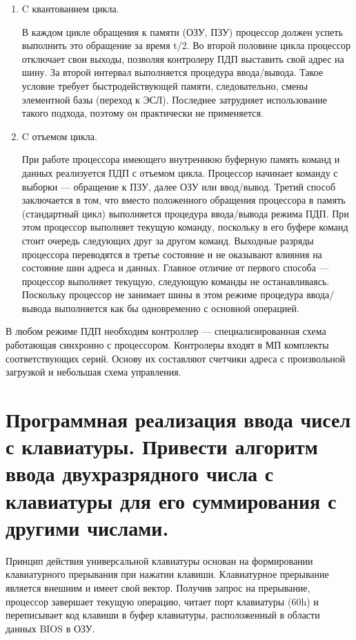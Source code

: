 \documentclass[unicode, 12pt, a4paper, oneside]{article}
\begin{document}
\begin{enumerate}
\begin{enumerate}
	\item C квантованием цикла.
	\par В каждом цикле обращения к памяти (ОЗУ, ПЗУ) процессор должен успеть выполнить это обращение за время t/2. Во второй половине цикла процессор отключает свои выходы, позволяя контролеру ПДП выставить свой адрес на шину. За второй интервал выполняется процедура ввода/вывода. Такое условие требует быстродействующей памяти, следовательно, смены элементной базы (переход к ЭСЛ). Последнее затрудняет использование такого подхода, поэтому он практически не применяется.
	
	\item C отъемом цикла.
	\par При работе процессора имеющего внутреннюю буферную память команд и данных реализуется ПДП с отъемом цикла. Процессор начинает команду с выборки — обращение к ПЗУ, далее ОЗУ или ввод/вывод. Третий способ заключается в том, что вместо положенного обращения процессора в память (стандартный цикл) выполняется процедура ввода/вывода режима ПДП. При этом процессор выполняет текущую команду, поскольку в его буфере команд стоит очередь следующих друг за другом команд. Выходные разряды процессора переводятся в третье состояние и не оказывают влияния на состояние шин адреса и данных. Главное отличие от первого способа — процессор выполняет текущую, следующую команды не останавливаясь. Поскольку процессор не занимает шины в этом режиме процедура ввода/вывода выполняется как бы одновременно с основной операцией.
	\end{enumerate}

В любом режиме ПДП необходим контроллер --- специализированная схема работающая синхронно с процессором. Контролеры входят в МП комплекты соответствующих серий. Основу их составляют счетчики адреса с произвольной загрузкой и небольшая схема управления.
\end{enumerate}


\section{Программная реализация ввода чисел с клавиатуры. Привести алгоритм ввода двухразрядного числа с клавиатуры для его суммирования с другими числами.}

Принцип действия универсальной клавиатуры основан на формировании клавиатурного прерывания при нажатии клавиши. Клавиатурное прерывание является внешним и имеет свой вектор. Получив запрос на прерывание, процессор завершает текущую операцию, читает порт клавиатуры (60h) и переписывает код клавиши в буфер клавиатуры, расположенный в области данных BIOS в ОЗУ.
\end{document}
